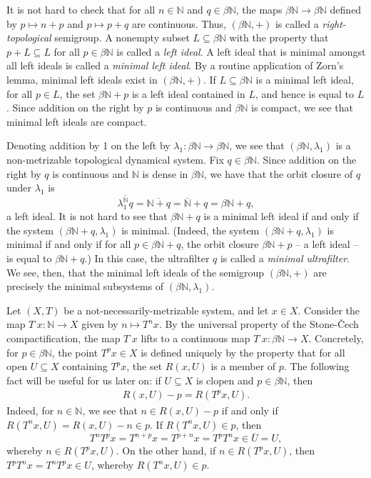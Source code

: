 \documentclass[letter,11pt]{article}
\theoremstyle{plain}
\theoremstyle{definition}
\theoremstyle{plain}
\theoremstyle{plain}
\numberwithin{equation}{section}
\newcommand{\Cech}{\v{C}ech}
\newcommand{\N}{\mathbb{N}}
\begin{document}
It is not hard to check that for all $n \in \N$ and $q \in \beta \N$, the maps $\beta \N \to \beta \N$ defined by $p \mapsto n + p$ and $p \mapsto p + q$ are continuous.  Thus, $(\beta \N, +)$ is called a \emph{right-topological} semigroup.  A nonempty subset $L \subseteq \beta \N$ with the property that $p + L \subseteq L$ for all $p \in \beta \N$ is called a \emph{left ideal}.  A left ideal that is minimal amongst all left ideals is called a \emph{minimal left ideal}.  By a routine application of Zorn's lemma, minimal left ideals exist in $(\beta \N, +)$.  If $L \subseteq \beta \N$ is a minimal left ideal, for all $p \in L$, the set $\beta \N + p$ is a left ideal contained in $L$, and hence is equal to $L$.  Since addition on the right by $p$ is continuous and $\beta \N$ is compact, we see that minimal left ideals are compact.

Denoting addition by 1 on the left by $\lambda_1: \beta \N \to \beta \N$, we see that $(\beta \N, \lambda_1)$ is a non-metrizable topological dynamical system.  Fix $q \in \beta \N$.  Since addition on the right by $q$ is continuous and $\N$ is dense in $\beta \N$, we have that the orbit closure of $q$ under $\lambda_1$ is
\[\overline{\lambda_1^{\N} q} = \overline{ \N + q } = \overline{\N} + q = \beta \N + q,\]
a left ideal.  It is not hard to see that $\beta \N + q$ is a minimal left ideal if and only if the system $(\beta \N + q, \lambda_1)$ is minimal. (Indeed, the system $(\beta \N + q, \lambda_1)$ is minimal if and only if for all $p \in \beta \N + q$, the orbit closure $\beta \N + p$ -- a left ideal -- is equal to $\beta \N + q$.)  In this case, the ultrafilter $q$ is called a \emph{minimal ultrafilter}.  We see, then, that the minimal left ideals of the semigroup $(\beta \N, +)$ are precisely the minimal subsystems of $(\beta \N, \lambda_1)$.


Let $(X,T)$ be a not-necessarily-metrizable system, and let $x \in X$.  Consider the map $T^{\displaystyle \cdot} x: \N \to X$ given by $n \mapsto T^n x$.  By the universal property of the Stone-\Cech{} compactification, the map $T^{\displaystyle \cdot} x$ lifts to a continuous map $T^{\displaystyle \cdot} x: \beta \N \to X$.  Concretely, for $p \in \beta \N$, the point $T^p x \in X$ is defined uniquely by the property that for all open $U \subseteq X$ containing $T^p x$, the set $R(x,U)$ is a member of $p$.  The following fact will be useful for us later on: if $U \subseteq X$ is clopen and $p \in \beta \N$, then
\begin{align}
    \label{eqn_ultrafilter_shift_of_return_set}
    R(x,U) - p = R(T^p x, U).
\end{align}
Indeed, for $n \in \N$, we see that $n \in R(x,U) - p$ if and only if $R(T^n x, U) = R(x,U) - n \in p$.  If $R(T^n x, U) \in p$, then
\[T^n T^p x = T^{n + p} x = T^{p + n} x = T^p T^n x \in \overline{U} = U,\]
whereby $n \in R(T^p x, U)$.  On the other hand, if $n \in R(T^p x, U)$, then $T^p T^n x = T^n T^p x \in U$, whereby $R(T^n x, U) \in p$.
\end{document}
